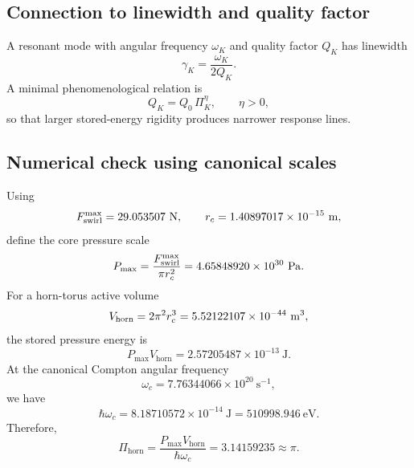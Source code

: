     \subsection*{Connection to linewidth and quality factor}
        
        A resonant mode with angular frequency \(\omega_K\) and quality factor \(Q_K\) has linewidth
        \begin{equation}
            \gamma_K
            =
            \frac{\omega_K}{2Q_K}.
            \label{eq:linewidth_quality_factor}
        \end{equation}
        A minimal phenomenological relation is
        \begin{equation}
            Q_K
            =
            Q_0\,\Pi_K^\eta,
            \qquad
            \eta>0,
            \label{eq:Q_rigidity_ansatz}
        \end{equation}
        so that larger stored-energy rigidity produces narrower response lines.
    
    \subsection*{Numerical check using canonical scales}
        
        Using
        \[
            \Fswirlmax = 29.053507\ \mathrm{N},
            \qquad
            \rc = 1.40897017\times10^{-15}\ \mathrm{m},
        \]
        define the core pressure scale
        \begin{equation}
            P_{\max}
            =
            \frac{F_{\text{swirl}}^{\max}}{\pi r_c^2}
            =
            4.65848920\times10^{30}\ \mathrm{Pa}.
            \label{eq:Pmax_numeric}
        \end{equation}
        For a horn-torus active volume
        \begin{equation}
            V_{\mathrm{horn}}
            =
            2\pi^2 r_c^3
            =
            5.52122107\times10^{-44}\ \mathrm{m^3},
            \label{eq:horn_volume_numeric}
        \end{equation}
        the stored pressure energy is
        \begin{equation}
            P_{\max}V_{\mathrm{horn}}
            =
            2.57205487\times10^{-13}\ \mathrm{J}.
            \label{eq:pressure_energy_numeric}
        \end{equation}
        At the canonical Compton angular frequency
        \[
            \omega_c
            =
            7.76344066\times10^{20}\ \mathrm{s^{-1}},
        \]
        we have
        \begin{equation}
            \hbar\omega_c
            =
            8.18710572\times10^{-14}\ \mathrm{J}
            =
            510998.946\ \mathrm{eV}.
            \label{eq:hbarOmega_numeric}
        \end{equation}
        Therefore,
        \begin{equation}
            \Pi_{\mathrm{horn}}
            =
            \frac{P_{\max}V_{\mathrm{horn}}}
            {\hbar\omega_c}
            =
            3.14159235
            \approx \pi.
            \label{eq:Pi_horn_numeric}
        \end{equation}
    
